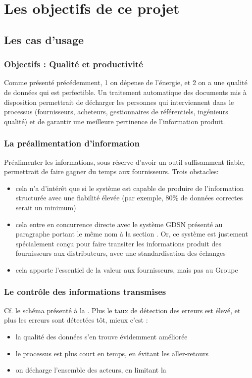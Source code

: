 \part{Les objectifs de ce projet}
    \chapter{Les cas d'usage}
        \section{Objectifs : Qualité et productivité}
        Comme présenté précédemment, 1 on dépense de l'énergie, et 2 on a une qualité de données qui est perfectible.
        Un traitement automatique des documents mis à disposition permettrait de décharger les personnes qui interviennent dans le processus (fournisseurs, acheteurs, gestionnaires de référentiels, ingénieurs qualité) et de garantir une meilleure pertinence de l'information produit.

        \section{La préalimentation d'information}
        Préalimenter les informations, sous réserve d'avoir un outil suffisamment fiable, permettrait de faire gagner du temps aux fournisseurs.
        Trois obstacles:
        \begin{itemize}
            \item cela n'a d'intérêt que si le système est capable de produire de l'information structurée avec une fiabilité élevée (par exemple, 80\% de données correctes serait un minimum)
            \item cela entre en concurrence directe avec le système GDSN présenté au paragraphe portant le même nom à la section .
            Or, ce système est justement spécialement conçu pour faire transiter les informations produit des fournisseurs aux distributeurs, avec une standardisation des échanges
            \item cela apporte l'essentiel de la valeur aux fournisseurs, mais pas au Groupe
        \end{itemize}

        \section{Le contrôle des informations transmises}

        Cf. le schéma présenté à la .
        Plus le taux de détection des erreurs est élevé, et plus les erreurs sont détectées tôt, mieux c'est : 
        \begin{itemize}
            \item la qualité des données s'en trouve évidemment améliorée
            \item le processus est plus court en temps, en évitant les aller-retours
            \item on décharge l'ensemble des acteurs, en limitant la
             
        \end{itemize} 


